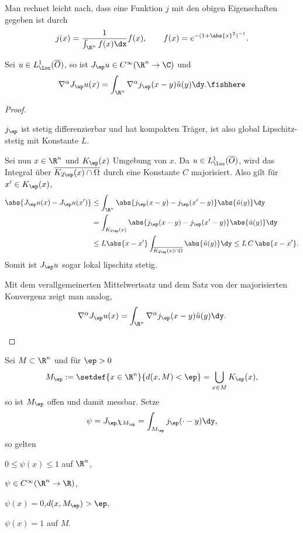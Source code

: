 Man rechnet leicht nach, dass eine Funktion $j$ mit den obigen Eigenschaften
gegeben ist durch
\begin{align*}
j(x) = \frac{1}{\int_{\R^n} f(x)\dx} f(x),\qquad f(x) = e^{-(1+\abs{x}^2)^{-1}}.
\end{align*}

\begin{prop}
\label{prop:7.43}
Sei $u\in L^1_\loc(\overline{O})$, so ist $J_\ep u \in
C^\infty(\R^n\to\C)$ und
\begin{align*}
\nabla^\alpha J_\ep u(x) = \int_{\R^n} \nabla^\alpha
j_\ep(x-y)\tilde{u}(y)\dy.\fishhere
\end{align*}
\end{prop}
\begin{proof}
\begin{proofenum}
\item $j_\ep$ ist stetig differenzierbar und hat kompakten Träger, ist also
global Lipschitz-stetig mit Konstante $L$.

Sei nun $x\in\R^n$ und $K_\ep(x)$ Umgebung von $x$.
Da $u\in L^1_\loc(\overline{O})$, wird das Integral über
$\overline{K_{2\ep}(x)\cap\Omega}$ durch eine
Konstante $C$ majorisiert. Also gilt für $x'\in K_\ep(x)$,
\begin{align*}
\abs{J_\ep u(x)-J_\ep u(x')} &\le 
\int_{\R^n} \abs{j_\ep(x-y)-j_\ep(x'-y)}\abs{\tilde{u}(y)}\dy\\
&=\int_{K_{2\ep}(x)} \abs{j_\ep(x-y)-j_\ep(x'-y)}\abs{\tilde{u}(y)}\dy\\
&\le  L\abs{x-x'} \int_{\overline{K_{2\ep}(x)\cap \Omega}}
\abs{\tilde{u}(y)}\dy
\le L\, C\, \abs{x-x'}.
\end{align*}
Somit ist $J_\ep u$ sogar lokal lipschitz stetig.
\item Mit dem verallgemeinerten Mittelwertsatz und dem Satz von der
majorisierten Konvergenz zeigt man analog,
\begin{align*}
\nabla^\alpha J_\ep u(x) = \int_{\R^n} \nabla^\alpha
j_\ep(x-y)\tilde{u}(y)\dy.\qedhere
\end{align*}
\end{proofenum}
\end{proof}

\begin{prop}[Abschneidefunktion]
\label{prop:7.44}
Sei $M\subset\R^n$ und für $\ep > 0$
\begin{align*}
M_\ep := \setdef{x\in\R^n}{d(x,M) < \ep} = \bigcup_{x\in M} K_\ep(x),
\end{align*}
so ist $M_\ep$ offen und damit messbar. Setze
\begin{align*}
\psi = J_\ep \chi_{M_\ep} = \int_{M_\ep} j_\ep(\cdot-y)\dy,
\end{align*}
so gelten
\begin{equivenum}
\item $0\le \psi(x)\le 1$ auf $\R^n$,
\item $\psi\in C^\infty(\R^n\to\R)$,
\item $\psi(x) = 0$,\quad $d(x,M_\ep) > \ep$,
\item $\psi(x) = 1$ auf $M$.\fishhere
\end{equivenum}
\end{prop}


